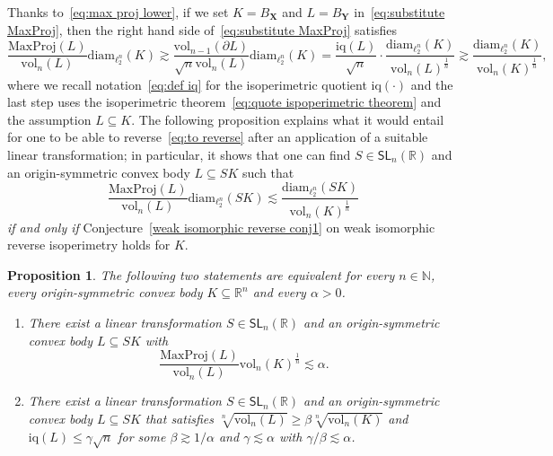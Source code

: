 \documentclass[11pt,reqno]{amsart}
\renewcommand{\le}{\leqslant}
\renewcommand{\ge}{\geqslant}
\newcommand{\diam}{\mathrm{diam}}
\newcommand{\X}{\mathbf X}
\newcommand{\Y}{\mathbf Y}
\newcommand{\R}{\mathbb R}
\newtheorem{proposition}[theorem]{Proposition}
\theoremstyle{remark}
\newcommand{\iq}{\mathrm{iq}}
\newcommand{\SL}{\mathsf{SL}}
\renewcommand{\subset}{\subseteq}
\newcommand{\N}{\mathbb N}
\newcommand{\vol}{\mathrm{vol}}
\renewcommand{\1}{\mathbf 1}
\begin{document}
Thanks to~\eqref{eq:max proj lower}, if we set $K=B_\X$ and $L=B_\Y$ in~\eqref{eq:substitute MaxProj}, then the right hand side of~\eqref{eq:substitute MaxProj} satisfies
\begin{equation}\label{eq:to reverse}
\frac{\mathrm{MaxProj}(L)}{\vol_n(L)}\diam_{\ell_2^n}(K)\gtrsim \frac{\vol_{n-1}(\partial L)}{\sqrt{n}\vol_n(L)}\diam_{\ell_2^n}(K)= \frac{\iq(L)}{\sqrt{n}}\cdot \frac{\diam_{\ell_2^n}(K)}{\vol_n(L)^{\frac{1}{n}}}\gtrsim \frac{\diam_{\ell_2^n}(K)}{\vol_n(K)^{\frac{1}{n}}},
\end{equation}
where we recall notation~\eqref{eq:def iq}  for the isoperimetric quotient $\iq(\cdot)$ and the last step  uses the isoperimetric theorem~\eqref{eq:quote ispoperimetric theorem} and the assumption $L\subset K$. The following proposition explains what it would entail for one to be able to reverse~\eqref{eq:to reverse} after an application of a suitable linear transformation; in particular, it shows that one can find $S\in \SL_n(\R)$ and an origin-symmetric convex body $L\subset SK$ such that
$$
\frac{\mathrm{MaxProj}(L)}{\vol_n(L)}\diam_{\ell_2^n}(SK)\lesssim \frac{\diam_{\ell_2^n}(SK)}{\vol_n(K)^{\frac{1}{n}}}
$$
{\em if and only if} Conjecture~\ref{weak isomorphic reverse conj1} on weak isomorphic reverse isoperimetry holds for $K$.



\begin{proposition}\label{prop:equivalence of upper bound and weak iso}The following two statements are equivalent for every $n\in\N$, every origin-symmetric convex body $K\subset \R^n$ and every $\alpha>0$.
\begin{enumerate}
\item There exist  a linear transformation $S\in \SL_n(\R)$ and an origin-symmetric convex body $L\subset S K$ with
\begin{equation}\label{eq:1 in equivalence KL}
\frac{\mathrm{MaxProj}(L)}{\vol_n(L)}\vol_n(K)^{\frac{1}{n}}\lesssim \alpha.
\end{equation}
\item There exist a linear transformation $S\in \SL_n(\R)$ and an origin-symmetric convex body $L\subset SK$ that satisfies $\sqrt[n]{\vol_n(L)}\ge \beta\sqrt[n]{\vol_n(K)}$ and $\iq(L)\le \gamma\sqrt{n}$ for some $\beta\gtrsim 1/\alpha$ and $\gamma \lesssim \alpha$ with $\gamma/\beta\lesssim \alpha$.
\end{enumerate}
\end{proposition}
\end{document}
